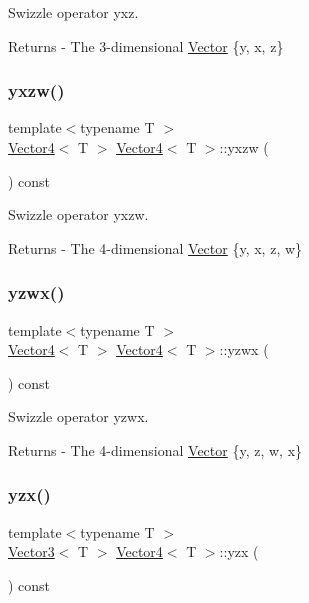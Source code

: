 Swizzle operator yxz. \begin{DoxyReturn}{Returns}
-\/ The 3-\/dimensional \mbox{\hyperlink{class_vector}{Vector}} \{y, x, z\} 
\end{DoxyReturn}
\mbox{\label{class_vector4_ae52ef26b0b1a59790fe734a51c646f5c}} 
\subsubsection{\texorpdfstring{yxzw()}{yxzw()}}
{\footnotesize\ttfamily template$<$typename T $>$ \\
\mbox{\hyperlink{class_vector4}{Vector4}}$<$ T $>$ \mbox{\hyperlink{class_vector4}{Vector4}}$<$ T $>$\+::yxzw (\begin{DoxyParamCaption}{ }\end{DoxyParamCaption}) const}

Swizzle operator yxzw. \begin{DoxyReturn}{Returns}
-\/ The 4-\/dimensional \mbox{\hyperlink{class_vector}{Vector}} \{y, x, z, w\} 
\end{DoxyReturn}
\mbox{\label{class_vector4_ababd977a9e4a09dcd5a0058fb52367ff}} 
\subsubsection{\texorpdfstring{yzwx()}{yzwx()}}
{\footnotesize\ttfamily template$<$typename T $>$ \\
\mbox{\hyperlink{class_vector4}{Vector4}}$<$ T $>$ \mbox{\hyperlink{class_vector4}{Vector4}}$<$ T $>$\+::yzwx (\begin{DoxyParamCaption}{ }\end{DoxyParamCaption}) const}

Swizzle operator yzwx. \begin{DoxyReturn}{Returns}
-\/ The 4-\/dimensional \mbox{\hyperlink{class_vector}{Vector}} \{y, z, w, x\} 
\end{DoxyReturn}
\mbox{\label{class_vector4_a5a5b166bcd45c5585e433699cdff9341}} 
\subsubsection{\texorpdfstring{yzx()}{yzx()}}
{\footnotesize\ttfamily template$<$typename T $>$ \\
\mbox{\hyperlink{class_vector3}{Vector3}}$<$ T $>$ \mbox{\hyperlink{class_vector4}{Vector4}}$<$ T $>$\+::yzx (\begin{DoxyParamCaption}{ }\end{DoxyParamCaption}) const}

